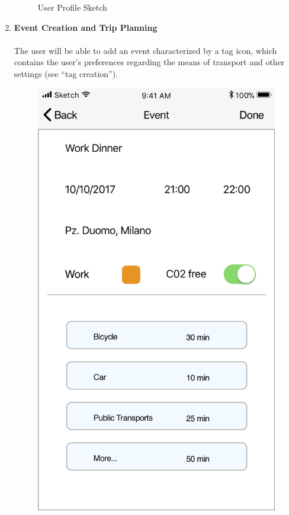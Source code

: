\begin{enumerate}
\begin{figure}[H]
				\caption{User Profile Sketch}
			\end{figure}
	\item \textbf{Event Creation and Trip Planning}\\
			\vspace{0cm}\\
			The user will be able to add an event characterized by a tag icon, which contains the user’s preferences regarding the means of transport and other settings (see “tag creation”).
			\begin{figure}[H]
				\centering
				\includegraphics[scale=0.25]{Images/Sketch/Event_Creation_1}

\end{figure}
\end{enumerate}

